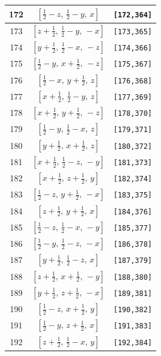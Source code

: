 \documentclass[fleqn,8pt]{jsarticle}
\begin{document}
\begin{longtable}{ccc}
172 & $\left[ \frac{1}{2} - z,\, \frac{1}{2} - y,\, x \right]$ & {\tt [172,364]} \\ \hline
173 & $\left[ z + \frac{1}{2},\, \frac{1}{2} - y,\, - x \right]$ & {\tt [173,365]} \\ \hline
174 & $\left[ y + \frac{1}{2},\, \frac{1}{2} - x,\, - z \right]$ & {\tt [174,366]} \\ \hline
175 & $\left[ \frac{1}{2} - y,\, x + \frac{1}{2},\, - z \right]$ & {\tt [175,367]} \\ \hline
176 & $\left[ \frac{1}{2} - x,\, y + \frac{1}{2},\, z \right]$ & {\tt [176,368]} \\ \hline
177 & $\left[ x + \frac{1}{2},\, \frac{1}{2} - y,\, z \right]$ & {\tt [177,369]} \\ \hline
178 & $\left[ x + \frac{1}{2},\, y + \frac{1}{2},\, - z \right]$ & {\tt [178,370]} \\ \hline
179 & $\left[ \frac{1}{2} - y,\, \frac{1}{2} - x,\, z \right]$ & {\tt [179,371]} \\ \hline
180 & $\left[ y + \frac{1}{2},\, x + \frac{1}{2},\, z \right]$ & {\tt [180,372]} \\ \hline
181 & $\left[ x + \frac{1}{2},\, \frac{1}{2} - z,\, - y \right]$ & {\tt [181,373]} \\ \hline
182 & $\left[ x + \frac{1}{2},\, z + \frac{1}{2},\, y \right]$ & {\tt [182,374]} \\ \hline
183 & $\left[ \frac{1}{2} - z,\, y + \frac{1}{2},\, - x \right]$ & {\tt [183,375]} \\ \hline
184 & $\left[ z + \frac{1}{2},\, y + \frac{1}{2},\, x \right]$ & {\tt [184,376]} \\ \hline
185 & $\left[ \frac{1}{2} - z,\, \frac{1}{2} - x,\, - y \right]$ & {\tt [185,377]} \\ \hline
186 & $\left[ \frac{1}{2} - y,\, \frac{1}{2} - z,\, - x \right]$ & {\tt [186,378]} \\ \hline
187 & $\left[ y + \frac{1}{2},\, \frac{1}{2} - z,\, x \right]$ & {\tt [187,379]} \\ \hline
188 & $\left[ z + \frac{1}{2},\, x + \frac{1}{2},\, - y \right]$ & {\tt [188,380]} \\ \hline
189 & $\left[ y + \frac{1}{2},\, z + \frac{1}{2},\, - x \right]$ & {\tt [189,381]} \\ \hline
190 & $\left[ \frac{1}{2} - z,\, x + \frac{1}{2},\, y \right]$ & {\tt [190,382]} \\ \hline
191 & $\left[ \frac{1}{2} - y,\, z + \frac{1}{2},\, x \right]$ & {\tt [191,383]} \\ \hline
192 & $\left[ z + \frac{1}{2},\, \frac{1}{2} - x,\, y \right]$ & {\tt [192,384]} \\
\end{longtable}
\end{document}
